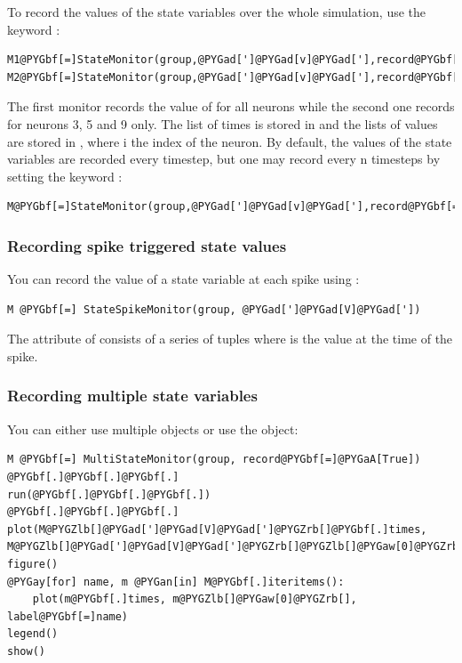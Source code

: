 \documentclass[letterpaper,10pt,english]{manual}
\begin{document}
To record the values of the state variables over the whole simulation, use the keyword :

\begin{Verbatim}[commandchars=@\[\]]
M1@PYGbf[=]StateMonitor(group,@PYGad[']@PYGad[v]@PYGad['],record@PYGbf[=]@PYGaA[True])
M2@PYGbf[=]StateMonitor(group,@PYGad[']@PYGad[v]@PYGad['],record@PYGbf[=]@PYGZlb[]@PYGaw[3],@PYGaw[5],@PYGaw[9]@PYGZrb[])
\end{Verbatim}

The first monitor records the value of  for all neurons while the second one records  for
neurons 3, 5 and 9 only. The list of times is stored in  and the lists of values are stored in
, where i the index of the neuron.
By default, the values of the state variables are recorded every timestep, but one may record every n timesteps
by setting the keyword :

\begin{Verbatim}[commandchars=@\[\]]
M@PYGbf[=]StateMonitor(group,@PYGad[']@PYGad[v]@PYGad['],record@PYGbf[=]@PYGaA[True],timestep@PYGbf[=]n)
\end{Verbatim}


\subsubsection{Recording spike triggered state values}

You can record the value of a state variable at each spike using \hyperlink{brian.StateSpikeMonitor}{}:

\begin{Verbatim}[commandchars=@\[\]]
M @PYGbf[=] StateSpikeMonitor(group, @PYGad[']@PYGad[V]@PYGad['])
\end{Verbatim}

The  attribute of  consists of a series of tuples  where  is the
value at the time of the spike.


\subsubsection{Recording multiple state variables}

You can either use multiple \hyperlink{brian.StateMonitor}{} objects or use the \hyperlink{brian.MultiStateMonitor}{}
object:

\begin{Verbatim}[commandchars=@\[\]]
M @PYGbf[=] MultiStateMonitor(group, record@PYGbf[=]@PYGaA[True])
@PYGbf[.]@PYGbf[.]@PYGbf[.]
run(@PYGbf[.]@PYGbf[.]@PYGbf[.])
@PYGbf[.]@PYGbf[.]@PYGbf[.]
plot(M@PYGZlb[]@PYGad[']@PYGad[V]@PYGad[']@PYGZrb[]@PYGbf[.]times, M@PYGZlb[]@PYGad[']@PYGad[V]@PYGad[']@PYGZrb[]@PYGZlb[]@PYGaw[0]@PYGZrb[])
figure()
@PYGay[for] name, m @PYGan[in] M@PYGbf[.]iteritems():
    plot(m@PYGbf[.]times, m@PYGZlb[]@PYGaw[0]@PYGZrb[], label@PYGbf[=]name)
legend()
show()
\end{Verbatim}
\end{document}
